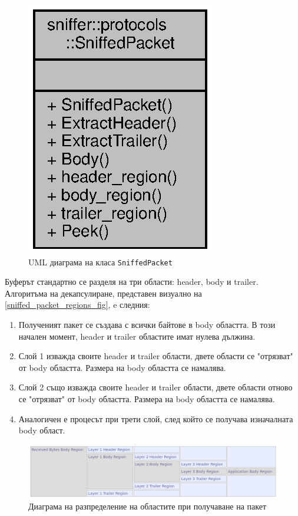 \documentclass[12pt,a4paper,oneside]{book}
\begin{document}
\begin{figure}[h!]
  \centering
  \includegraphics[scale=.7]{figures/sniffed_packet_uml.eps}
  \caption{UML диаграма на класа \texttt{SniffedPacket}}
  \label{sniffed_packet_uml_fig}
\end{figure}

Буферът стандартно се разделя на три области: header, body и trailer.
Алгоритъма на декапсулиране, представен визуално на
\autoref{sniffed_packet_regions_fig}, e следния:

\begin{enumerate}
  \item
    Полученият пакет се създава с всички байтове в body областта. В този начален
    момент, header и trailer областите имат нулева дължина.
\item
  Слой 1 изважда своите header и trailer области, двете области се "отрязват" от
  body областта. Размера на body областта се намалява.
\item
  Слой 2 също изважда своите header и trailer области, двете области отново се
  "отрязват" от body областта. Размера на body областта се намалява.
\item
  Аналогичен е процесът при трети слой, след който се получава изначалната body
  област.
\end{enumerate}

\begin{figure}[h!]
  \centering
  \includegraphics[width=\textwidth]{figures/sniffed_packet_regions.png}
  \caption{Диаграма на разпределение на областите при получаване на пакет}
  \label{sniffed_packet_regions_fig}
\end{figure}
\end{document}
